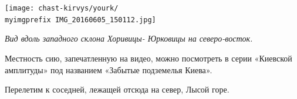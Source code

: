 \begin{center}
\texttt{[image: chast-kirvys/yourk/\\myimgprefix IMG\_20160605\_150112.jpg]}

\textit{Вид вдоль западного склона Хоривицы- Юрковицы на северо-восток.}
\end{center}






Местность сию, запечатленную на видео, можно посмотреть в серии «Киевской амплитуды» под названием «Забытые подземелья Киева».


Перелетим к соседней, лежащей отсюда на север, Лысой горе.